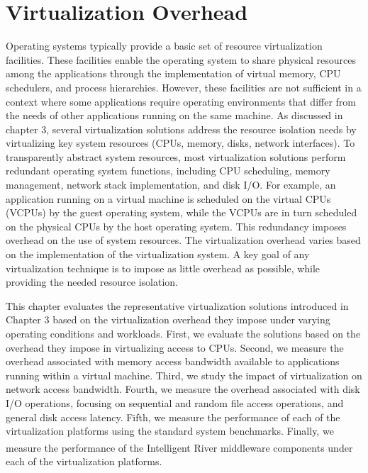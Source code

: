 \chapter{Virtualization Overhead}


Operating systems typically provide a basic set of resource virtualization facilities. These facilities enable the operating system to share physical resources among the applications through the implementation of virtual memory, CPU schedulers, and process hierarchies. However, these facilities are not sufficient in a context where some applications require operating environments that differ from the needs of other applications running on the same machine. As discussed in chapter 3, several virtualization solutions address the resource isolation needs by virtualizing key system resources (CPUs, memory, disks, network interfaces). To transparently abstract system resources, most virtualization solutions perform redundant operating system functions, including CPU scheduling, memory management, network stack implementation, and disk I/O. For example, an application running on a virtual machine is scheduled on the virtual CPUs (VCPUs) by the guest operating system, while the VCPUs are in turn scheduled on the physical CPUs by the host operating system. This redundancy imposes overhead on the use of system resources. The virtualization overhead varies based on the implementation of the virtualization system. A key goal of any virtualization technique is to impose as little overhead as possible, while providing the needed resource isolation. 

This chapter evaluates the representative virtualization solutions introduced in Chapter 3 based on the virtualization overhead they impose under varying operating conditions and workloads. First, we evaluate the solutions based on the overhead they impose in virtualizing access to CPUs. Second, we measure the overhead associated with memory access bandwidth available to applications running within a virtual machine. Third, we study the impact of virtualization on network access bandwidth. Fourth, we measure the overhead associated with disk I/O operations, focusing on sequential and random file access operations, and general disk access latency. Fifth, we measure the performance of each of the virtualization platforms using the standard system benchmarks. Finally, we measure the performance of the Intelligent River\textsuperscript{\textregistered} middleware components under each of the virtualization platforms.


